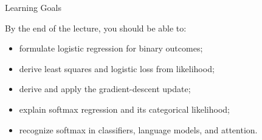 
\begin{frame}[t]{Learning Goals}
\vspace{.03cm}
{\fontsize{13.2}{16.2}\selectfont
By the end of the lecture, you should be able to:
\begin{itemize}\setlength{\itemsep}{.18cm}
\item formulate logistic regression for binary outcomes;
\item derive least squares and logistic loss from likelihood;
\item derive and apply the gradient-descent update;
\item explain softmax regression and its categorical likelihood;
\item recognize softmax in classifiers, language models, and attention.
\end{itemize}}
\end{frame}

